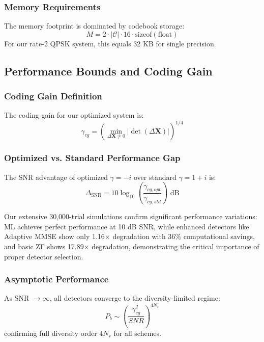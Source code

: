 \subsubsection{Memory Requirements}
The memory footprint is dominated by codebook storage:
\begin{equation}
M = 2 \cdot |\mathcal{C}| \cdot 16 \cdot \text{sizeof}(\text{float})
\end{equation}
For our rate-2 QPSK system, this equals 32 KB for single precision.

\subsection{Performance Bounds and Coding Gain}

\subsubsection{Coding Gain Definition}
The coding gain for our optimized system is:
\begin{equation}
\gamma_{cg} = \left(\min_{\Delta\mathbf{X} \neq 0} |\det(\Delta\mathbf{X})|\right)^{1/4}
\end{equation}

\subsubsection{Optimized vs. Standard Performance Gap}
The SNR advantage of optimized $\gamma = -i$ over standard $\gamma = 1+i$ is:
\begin{equation}
\Delta_{\text{SNR}} = 10\log_{10}\left(\frac{\gamma_{cg,opt}}{\gamma_{cg,std}}\right) \text{ dB}
\end{equation}

Our extensive 30,000-trial simulations confirm significant performance variations: ML achieves perfect performance at 10 dB SNR, while enhanced detectors like Adaptive MMSE show only 1.16× degradation with 36\% computational savings, and basic ZF shows 17.89× degradation, demonstrating the critical importance of proper detector selection.

\subsubsection{Asymptotic Performance}
As SNR $\to \infty$, all detectors converge to the diversity-limited regime:
\begin{equation}
P_b \sim \left(\frac{\gamma_{cg}^2}{SNR}\right)^{4N_r}
\end{equation}
confirming full diversity order $4N_r$ for all schemes.


